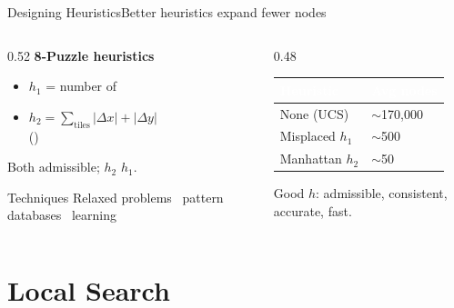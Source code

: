 \documentclass[aspectratio=169,11pt]{beamer}
\begin{document}
\begin{frame}{Designing Heuristics}{Better heuristics expand fewer nodes}
  \begin{columns}[T]
    \begin{column}{0.52\textwidth}
      \textbf{8-Puzzle heuristics}
      \begin{itemize}\small
        \item $h_1$ = number of 
        \item $h_2 = \sum_{\text{tiles}} |{\Delta x}| + |{\Delta y}|$ \\ ()
      \end{itemize}
      Both admissible; $h_2$  $h_1$.
      \vspace{0.4em}
      \begin{block}{Techniques}
        \scriptsize
        Relaxed problems \textbullet\ pattern databases \textbullet\ learning
      \end{block}
    \end{column}
    \begin{column}{0.48\textwidth}
      \small
      \renewcommand{\arraystretch}{1.3}
      \begin{tabularx}{\linewidth}{@{}>{\raggedright\arraybackslash}X >{\raggedright\arraybackslash}X@{}}
        \toprule
        \rowcolor{PrimaryDark}
        \textcolor{white}{Heuristic} & \textcolor{white}{Avg nodes} \\
        \midrule
        None (UCS) & $\sim$170{,}000 \\
        \rowcolor{PrimaryLight!25}
        Misplaced $h_1$ & $\sim$500 \\
        Manhattan $h_2$ & $\sim$50 \\
        \bottomrule
      \end{tabularx}
      \vspace{0.4em}
      \centering\scriptsize Good $h$: admissible, consistent, accurate, fast.
    \end{column}
  \end{columns}
\end{frame}

\section{Local Search}
\end{document}
